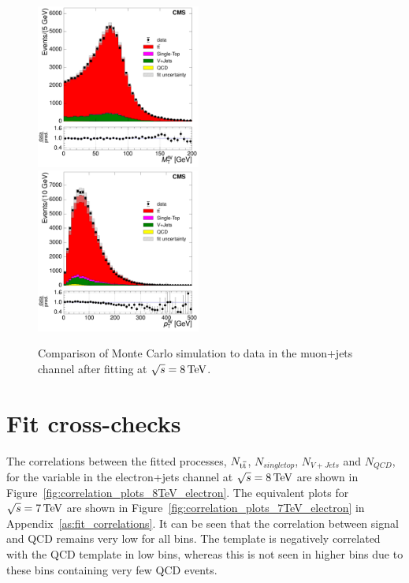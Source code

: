 \begin{figure}[hbtp]
     \includegraphics[width=0.48\textwidth]{Chapters/04_Analysis/04b_XSections/images/control_plots/after_fit/8TeV/MuPlusJets_patType1CorrectedPFMet_MT_2orMoreBtags_with_ratio.pdf}\\     
	 \includegraphics[width=0.48\textwidth]{Chapters/04_Analysis/04b_XSections/images/control_plots/after_fit/8TeV/MuPlusJets_patType1CorrectedPFMet_WPT_2orMoreBtags_with_ratio.pdf}\hfill
	 \caption[Comparison of Monte Carlo simulation to data in the muon+jets channel after fitting at
	 $\roots=8\TeV$.]{Comparison of Monte Carlo simulation to data in the muon+jets channel after fitting at
	 $\roots=8\TeV$.}
     \label{fig:data_mc_comparison_after_fit_8TeV_muon}
\end{figure}

\FloatBarrier

\section{Fit cross-checks}
\label{s:fit_cross_section}
The correlations between the fitted processes, $N_{\mathrm{t}\overline{\mathrm{t}}}$, $N_{singletop}$, $N_{V+Jets}$ and $N_{QCD}$, for
the \met variable in the electron+jets channel at $\roots=8\TeV$ are shown in
Figure~\ref{fig:correlation_plots_8TeV_electron}. The equivalent plots for $\sqrt{s}=7\,\text{Te\hspace{-.08em}V}$ are shown in
Figure~\ref{fig:correlation_plots_7TeV_electron} in Appendix~\ref{as:fit_correlations}. It can be seen that
the correlation between signal and QCD remains very low for all \met bins. The \VpJets template is negatively
correlated with the QCD template in low bins, whereas this is not seen in higher bins due to these bins
containing very few QCD events.


